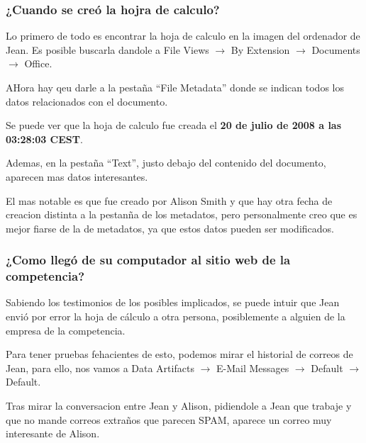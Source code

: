 \documentclass{article}
\begin{document}
\subsubsection*{¿Cuando se creó la hojra de calculo?}

Lo primero de todo es encontrar la hoja de calculo en la imagen del ordenador de Jean. Es posible buscarla dandole a File Views $\rightarrow$ By Extension $\rightarrow$ Documents $\rightarrow$ Office.


AHora hay qeu darle a la pestaña ``File Metadata'' donde se indican todos los datos relacionados con el documento.


Se puede ver que la hoja de calculo fue creada el \textbf{20 de julio de 2008 a las 03:28:03 CEST}.

Ademas, en la pestaña ``Text'', justo debajo del contenido del documento, aparecen mas datos interesantes.


El mas notable es que fue creado por Alison Smith y que hay otra fecha de creacion distinta a la pestanña de los metadatos, pero personalmente creo que es mejor fiarse de la de metadatos, ya que estos datos pueden ser modificados.

\subsubsection*{¿Como llegó de su computador al sitio web de la competencia?}

Sabiendo los testimonios de los posibles implicados, se puede intuir que Jean envió por error la hoja de cálculo a otra persona, posiblemente a alguien de la empresa de la competencia.

Para tener pruebas fehacientes de esto, podemos mirar el historial de correos de Jean, para ello, nos vamos a Data Artifacts $\rightarrow$ E-Mail Messages $\rightarrow$ Default $\rightarrow$ Default.


Tras mirar la conversacion entre Jean y Alison, pidiendole a Jean que trabaje y que no mande correos extraños que parecen SPAM, aparece un correo muy interesante de Alison.
\end{document}
